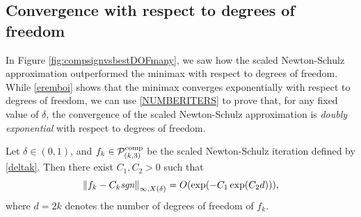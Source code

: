 
\subsection{Convergence with respect to degrees of freedom}

In Figure \ref{fig:compsignvsbestDOFmany}, we saw how the scaled Newton-Schulz approximation outperformed the minimax with respect to degrees of freedom. While \eqref{eremboi} shows that the minimax converges exponentially with respect to degrees of freedom, we can use \eqref{NUMBERITERS} to prove that, for any fixed value of $\delta$, the convergence of the scaled Newton-Schulz approximation is \textit{doubly exponential} with respect to degrees of freedom. 

\begin{thm}
Let $\delta \in (0,1)$, and $f_k \in \mathcal{P}_{(k,3)}^{\text{comp}}$ be the scaled Newton-Schulz iteration defined by \eqref{deltak}. Then there exist $C_1,C_2>0$ such that
\[\left\lVert f_k-C_k\emph{\text{sgn}}\right\rVert_{\infty,X(\delta)} = O(\exp(-C_1 \exp(C_2 d))),\]
where $d=2k$ denotes the number of degrees of freedom of $f_k$.
\end{thm}

